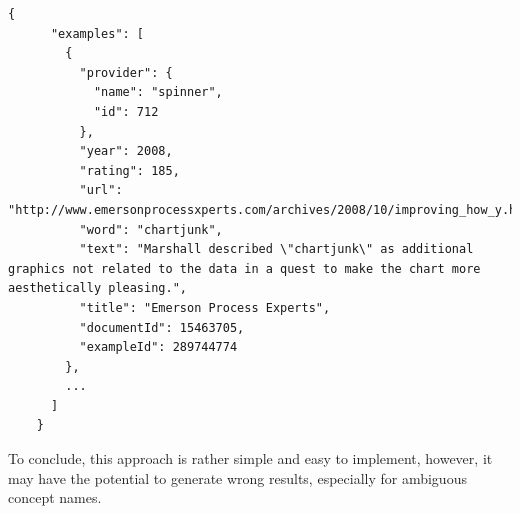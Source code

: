 \begin{lstlisting}[frame=single,breaklines=true,postbreak=\mbox{\textcolor{black}{$\hookrightarrow$}\space},caption=WordNik API response for the word \guillemotright chartjunk\guillemotleft,label=lst:WordNik_response_for_chartjunk]
	{
	  "examples": [
	    {
	      "provider": {
	        "name": "spinner",
	        "id": 712
	      },
	      "year": 2008,
	      "rating": 185,
	      "url": "http://www.emersonprocessxperts.com/archives/2008/10/improving_how_y.html",
	      "word": "chartjunk",
	      "text": "Marshall described \"chartjunk\" as additional graphics not related to the data in a quest to make the chart more aesthetically pleasing.",
	      "title": "Emerson Process Experts",
	      "documentId": 15463705,
	      "exampleId": 289744774
	    },
		...
	  ]
	}
\end{lstlisting}


To conclude, this approach is rather simple and easy to implement, however, it may have the potential to generate wrong results, especially for ambiguous concept names. 
